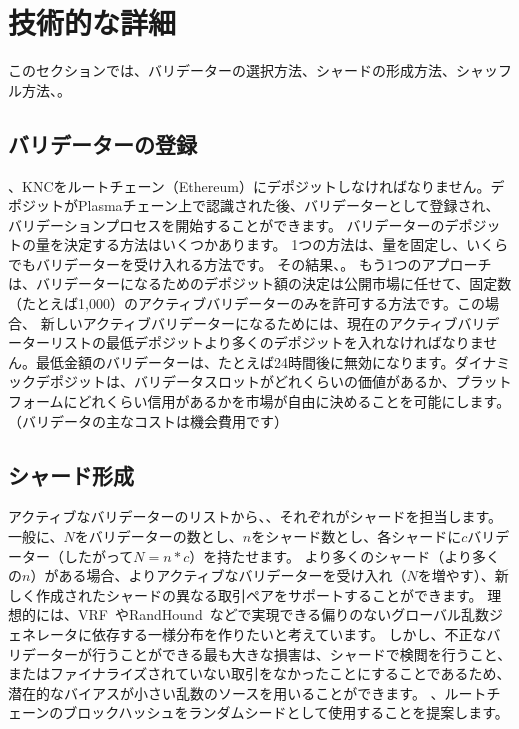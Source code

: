 \section{技術的な詳細}
\label{sec:details}

このセクションでは、バリデーターの選択方法、シャードの形成方法、シャッフル方法、。

\subsection{バリデーターの登録}
、KNCをルートチェーン（Ethereum）にデポジットしなければなりません。デポジットがPlasmaチェーン上で認識された後、バリデーターとして登録され、バリデーションプロセスを開始することができます。 バリデーターのデポジットの量を決定する方法はいくつかあります。 1つの方法は、量を固定し、いくらでもバリデーターを受け入れる方法です。 その結果、。 もう1つのアプローチは、バリデーターになるためのデポジット額の決定は公開市場に任せて、固定数（たとえば1,000）のアクティブバリデーターのみを許可する方法です。この場合、 新しいアクティブバリデーターになるためには、現在のアクティブバリデーターリストの最低デポジットより多くのデポジットを入れなければなりません。最低金額のバリデーターは、たとえば24時間後に無効になります。ダイナミックデポジットは、バリデータスロットがどれくらいの価値があるか、プラットフォームにどれくらい信用があるかを市場が自由に決めることを可能にします。（バリデータの主なコストは機会費用です）

\subsection{シャード形成}
アクティブなバリデーターのリストから、、それぞれがシャードを担当します。 一般に、$N$をバリデーターの数とし、$n$をシャード数とし、各シャードに$c$バリデーター（したがって$N = n*c$）を持たせます。 より多くのシャード（より多くの$n$）がある場合、よりアクティブなバリデーターを受け入れ（$N$を増やす）、新しく作成されたシャードの異なる取引ペアをサポートすることができます。 理想的には、VRF~\cite{algorand}やRandHound~\cite{randhound}などで実現できる偏りのないグローバル乱数ジェネレータに依存する一様分布を作りたいと考えています。 しかし、不正なバリデーターが行うことができる最も大きな損害は、シャードで検閲を行うこと、またはファイナライズされていない取引をなかったことにすることであるため、潜在的なバイアスが小さい乱数のソースを用いることができます。 、ルートチェーンのブロックハッシュをランダムシードとして使用することを提案します。

